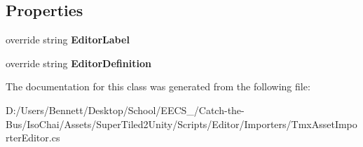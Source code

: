 \subsection*{Properties}
\begin{DoxyCompactItemize}
\item 
\mbox{\label{class_super_tiled2_unity_1_1_editor_1_1_tmx_asset_importer_editor_ad6e175507b73097ca7e949449d9ed807}} 
override string {\bfseries Editor\+Label}
\item 
\mbox{\label{class_super_tiled2_unity_1_1_editor_1_1_tmx_asset_importer_editor_a066aa1f69ffac7113358379a5a712850}} 
override string {\bfseries Editor\+Definition}
\end{DoxyCompactItemize}


The documentation for this class was generated from the following file\+:\begin{DoxyCompactItemize}
\item 
D\+:/\+Users/\+Bennett/\+Desktop/\+School/\+E\+E\+C\+S\+\_/\+Catch-\/the-\/\+Bus/\+Iso\+Chai/\+Assets/\+Super\+Tiled2\+Unity/\+Scripts/\+Editor/\+Importers/Tmx\+Asset\+Importer\+Editor.\+cs\end{DoxyCompactItemize}
